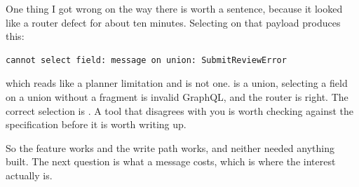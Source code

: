 One thing I got wrong on the way there is worth a sentence, because it looked
like a router defect for about ten minutes. Selecting  on that payload produces this:

\begin{verbatim}
cannot select field: message on union: SubmitReviewError
\end{verbatim}

which reads like a planner limitation and is not one. 
is a union, selecting a field on a union without a fragment is invalid GraphQL,
and the router is right. The correct selection is . A tool that disagrees with you is worth checking
against the specification before it is worth writing up.

\medskip
So the feature works and the write path works, and neither needed anything
built. The next question is what a message costs, which is where the interest
actually is.

%
